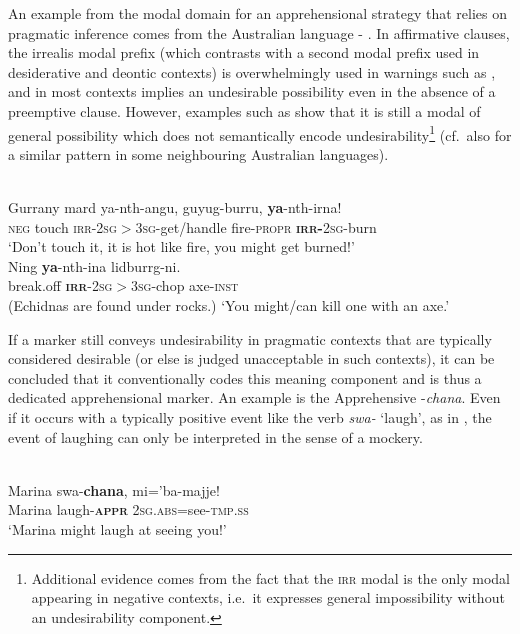 \documentclass[output=paper,colorlinks,citecolor=brown]{langscibook}
\begin{document}
 An example from the modal domain for an apprehensional strategy that relies on pragmatic inference comes from the Australian language - \citep{schultzeberndtcaudal2019}. In affirmative clauses, the irrealis modal prefix (which contrasts with a second modal prefix used in desiderative and deontic contexts) is overwhelmingly used in warnings such as , and in most contexts implies an undesirable possibility even in the absence of a preemptive clause. However, examples such as  show that it is still a modal of general possibility which does not semantically encode undesirability\footnote{Additional evidence comes from the fact that the \textsc{irr} modal is the only modal appearing in negative contexts, i.e.\ it expresses general impossibility without an undesirability component.} (cf.\ also \citet{chapters/browne} for a similar pattern in some neighbouring Australian languages).

\ea 
\label{ex:intro15} 
\\
\ea \label{ex:intro15a}
\gll Gurrany mard ya-nth-angu, guyug-burru, \textbf{ya}-nth-irna! \\
\textsc{neg} touch \textsc{irr-2sg$>$3sg-}get/handle fire-\textsc{propr} \textsc{\textbf{irr-}2sg-}burn \\
\glt `Don't touch it, it is hot like fire, you might get burned!' \\
\ex \label{ex:intro15b}
\gll Ning \textbf{ya}-nth-ina lidburrg-ni. \\
break.off \textsc{\textbf{irr}-2sg$>$3sg-}chop axe-\textsc{inst} \\
\glt (Echidnas are found under rocks.) `You might/can kill one with an axe.'
\z
\z

If a marker still conveys undesirability in pragmatic contexts that are typically considered desirable (or else is judged unacceptable in such contexts), it can be concluded that it conventionally codes this meaning component and is thus a dedicated apprehensional marker. An example is the  Apprehensive \nobreakdash-\textit{chana}. Even if it occurs with a typically positive event like the verb \textit{swa-} `laugh', as in , the event of laughing can only be interpreted in the sense of a mockery.


\ea 
\label{ex:intro16}
 \\
\gll Marina swa-\textbf{chana}, mi='ba-majje! \\
Marina laugh-\textsc{\textbf{appr}} \textsc{2sg.abs=}see-\textsc{tmp.ss} \\
\glt `Marina might laugh at seeing you!'
\z
\end{document}
